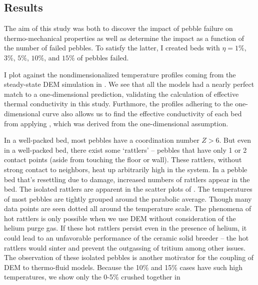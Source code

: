 \subsection{Results}
The aim of this study was both to discover the impact of pebble failure on thermo-mechanical properties as well as determine the impact as a function of the number of failed pebbles. To satisfy the latter, I created beds with $\eta = 1\%$, $3\%$, $5\%$, $10\%$, and $15\%$ of pebbles failed. 

I plot  against the nondimensionalized temperature profiles coming from the steady-state DEM simulation in . We see that all the models had a nearly perfect match to a one-dimensional prediction, validating the calculation of effective thermal conductivity in this study. Furthmore, the profiles adhering to the one-dimensional curve also allows us to find the effective conductivity of each bed from applying , which was derived from the one-dimensional assumption.

In a well-packed bed, most pebbles have a coordination number $Z > 6$. But even in a well-packed bed, there exist some `rattlers' -- pebbles that have only 1 or 2 contact points (aside from touching the floor or wall). These rattlers, without strong contact to neighbors, heat up arbitrarily high in the system. In a pebble bed that's resettling due to damage, increased numbers of rattlers appear in the bed. The isolated rattlers are apparent in the scatter plots of . The temperatures of most pebbles are tightly grouped around the parabolic average. Though many data points are seen dotted all around the temperature scale. The phenomena of hot rattlers is only possible when we use DEM without consideration of the helium purge gas. If these hot rattlers persist even in the presence of helium, it could lead to an unfavorable performance of the ceramic solid breeder -- the hot rattlers would sinter and prevent the outgassing of tritium among other issues. The observation of these isolated pebbles is another motivator for the coupling of DEM to thermo-fluid models. Because the 10\% and 15\% cases have such high temperatures, we show only the 0-5\% crushed together in 

